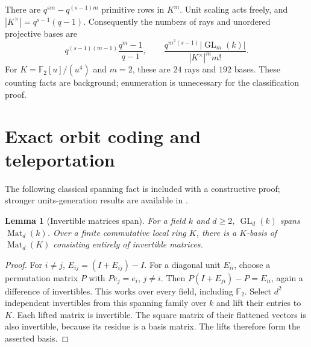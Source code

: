 \documentclass[11pt]{article}
\newtheorem{lemma}[theorem]{Lemma}
\theoremstyle{definition}\newtheorem{definition}[theorem]{Definition}
\theoremstyle{remark}\newtheorem{remark}[theorem]{Remark}
\newcommand{\F}{\mathbb F}
\newcommand{\A}{\F_2[u]/(u^4)}
\DeclareMathOperator{\GL}{GL}
\DeclareMathOperator{\Mat}{Mat}
\begin{document}
There are $q^{sm}-q^{(s-1)m}$ primitive rows in $K^m$. Unit scaling acts freely, and $|K^\times|=q^{s-1}(q-1)$. Consequently the numbers of rays and unordered projective bases are
\[
 q^{(s-1)(m-1)}\frac{q^m-1}{q-1},\qquad
 \frac{q^{m^2(s-1)}|\GL_m(k)|}{|K^\times|^m m!}.
\]
For $K=\A$ and $m=2$, these are $24$ rays and $192$ bases. These counting facts are background; enumeration is unnecessary for the classification proof.

\section{Exact orbit coding and teleportation}\label{sec:tasks}
The following classical spanning fact is included with a constructive proof; stronger units-generation results are available in \cite{Zelinsky1954,Henriksen1974}.
\begin{lemma}[Invertible matrices span]\label{lem:span}
For a field $k$ and $d\geq2$, $\GL_d(k)$ spans $\Mat_d(k)$. Over a finite commutative local ring $K$, there is a $K$-basis of $\Mat_d(K)$ consisting entirely of invertible matrices.
\end{lemma}
\begin{proof}
For $i\ne j$, $E_{ij}=(I+E_{ij})-I$. For a diagonal unit $E_{ii}$, choose a permutation matrix $P$ with $Pe_j=e_i$, $j\ne i$. Then $P(I+E_{ji})-P=E_{ii}$, again a difference of invertibles. This works over every field, including $\F_2$. Select $d^2$ independent invertibles from this spanning family over $k$ and lift their entries to $K$. Each lifted matrix is invertible. The square matrix of their flattened vectors is also invertible, because its residue is a basis matrix. The lifts therefore form the asserted basis.
\end{proof}
\end{document}
